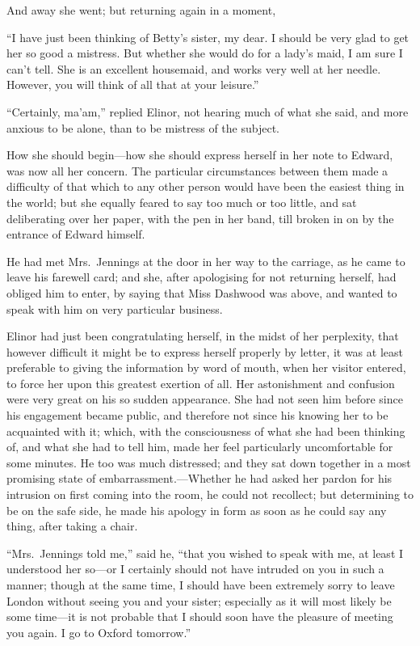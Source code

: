 \documentclass{article}
\begin{document}
And away she went; but returning again in a moment,

``I have just been thinking of Betty's sister, my dear.
I should be very glad to get her so good a mistress.
But whether she would do for a lady's maid, I am sure I
can't tell.  She is an excellent housemaid, and works
very well at her needle.  However, you will think of all
that at your leisure.''

``Certainly, ma'am,'' replied Elinor, not hearing
much of what she said, and more anxious to be alone,
than to be mistress of the subject.

How she should begin---how she should express
herself in her note to Edward, was now all her concern.
The particular circumstances between them made
a difficulty of that which to any other person would
have been the easiest thing in the world; but she
equally feared to say too much or too little, and sat
deliberating over her paper, with the pen in her band,
till broken in on by the entrance of Edward himself.

He had met Mrs.\ Jennings at the door in her way to
the carriage, as he came to leave his farewell card; and she,
after apologising for not returning herself, had obliged
him to enter, by saying that Miss Dashwood was above,
and wanted to speak with him on very particular business.

Elinor had just been congratulating herself,
in the midst of her perplexity, that however difficult it
might be to express herself properly by letter, it was
at least preferable to giving the information by word
of mouth, when her visitor entered, to force her upon this
greatest exertion of all.  Her astonishment and confusion
were very great on his so sudden appearance.  She had
not seen him before since his engagement became public,
and therefore not since his knowing her to be acquainted
with it; which, with the consciousness of what she
had been thinking of, and what she had to tell him,
made her feel particularly uncomfortable for some minutes.
He too was much distressed; and they sat down together
in a most promising state of embarrassment.---Whether he
had asked her pardon for his intrusion on first coming
into the room, he could not recollect; but determining
to be on the safe side, he made his apology in form
as soon as he could say any thing, after taking a chair.

``Mrs.\ Jennings told me,'' said he, ``that you wished
to speak with me, at least I understood her so---or I
certainly should not have intruded on you in such a manner;
though at the same time, I should have been extremely
sorry to leave London without seeing you and your sister;
especially as it will most likely be some time---it
is not probable that I should soon have the pleasure
of meeting you again.  I go to Oxford tomorrow.''
\end{document}
